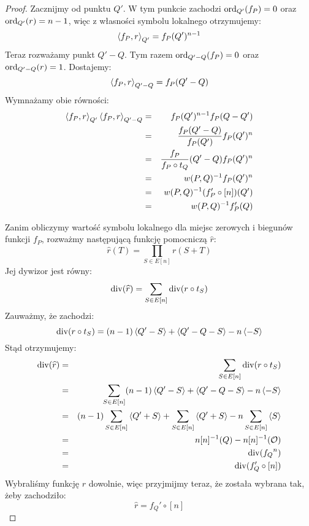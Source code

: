 \begin{proof}
\noindent
Zacznijmy od punktu $Q'$. W tym punkcie zachodzi
$\operatorname{ord}_{Q'}(f_P) = 0$ oraz $\operatorname{ord}_{Q'}(r) = n-1$,
więc z własności symbolu lokalnego otrzymujemy:
\begin{equation*}
\left\langle f_P , r \right\rangle_{Q'} = f_P(Q')^{n-1}
\end{equation*}
Teraz rozważamy punkt $Q' - Q$.
Tym razem $\operatorname{ord}_{Q' - Q}(f_P) = 0$ oraz $\operatorname{ord}_{Q' - Q}(r) = 1$.
Dostajemy:
\begin{equation*}
\left\langle f_P , r \right\rangle_{Q' - Q} = f_P(Q' - Q)
\end{equation*}
Wymnażamy obie równości:
\begin{eqnarray*}
\left\langle f_P , r \right\rangle_{Q'}\left\langle f_P , r \right\rangle_{Q' - Q}
& = & f_P(Q')^{n-1} f_P(Q - Q') \\
& = & \frac{f_P(Q' - Q)}{f_P(Q')} f_P(Q')^n \\
& = & \frac{f_P}{f_P \circ t_Q}(Q' - Q) f_P(Q')^n \\
& = & w(P,Q)^{-1} f_P(Q')^n \\
& = & w(P,Q)^{-1} (f_P' \circ [n])(Q') \\
& = & w(P,Q)^{-1} f_P'(Q)
\end{eqnarray*}

\noindent
Zanim obliczymy wartość symbolu lokalnego
dla miejsc zerowych i biegunów funkcji $f_P$,
rozważmy następującą funkcję pomocniczą $\widehat{r}$:
\begin{equation*}
\widehat{r}(T) = \prod_{S \in E[n]} r(S + T)
\end{equation*}
Jej dywizor jest równy:
\begin{equation*}
\operatorname{div}(\widehat{r}) = \sum_{S \in E[n]} \operatorname{div}(r \circ t_S)
\end{equation*}
Zauważmy, że zachodzi:
\begin{equation*}
\operatorname{div}(r \circ t_S) = (n-1)\left\langle Q' - S\right\rangle + \left\langle Q' - Q - S\right\rangle - n\left\langle-S\right\rangle
\end{equation*}
Stąd otrzymujemy:
\begin{eqnarray*}
\operatorname{div}(\widehat{r})
& = & \sum_{S \in E[n]} \operatorname{div}(r \circ t_S) \\
& = & \sum_{S \in E[n]} (n-1)\left\langle Q' - S\right\rangle + \left\langle Q' - Q - S\right\rangle - n\left\langle-S\right\rangle \\
& = & (n-1)\sum_{S \in E[n]}\left\langle Q' + S\right\rangle +
      \sum_{S \in E[n]}\left\langle Q' + S\right\rangle -
      n\sum_{S \in E[n]}\left\langle S\right\rangle \\
& = & n[n]^{-1}(Q) - n[n]^{-1}(\mathcal{O}) \\
& = & \operatorname{div}({f_Q}^n) \\
& = & \operatorname{div}(f_Q' \circ [n])
\end{eqnarray*}
Wybraliśmy funkcję $r$ dowolnie, więc przyjmijmy teraz,
że została wybrana tak, żeby zachodziło:
\begin{equation*}
\widehat{r} = f_Q' \circ [n]
\end{equation*}


\end{proof}
